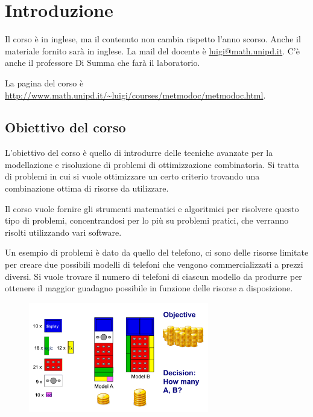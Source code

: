 

\chapter{Introduzione}

Il corso è in inglese, ma il contenuto non cambia rispetto l'anno scorso. Anche il materiale fornito sarà in inglese. La mail del docente è \url{luigi@math.unipd.it}. C'è anche il professore Di Summa che farà il laboratorio.

La pagina del corso è \url{http://www.math.unipd.it/~luigi/courses/metmodoc/metmodoc.html}.

\section{Obiettivo del corso}

L'obiettivo del corso è quello di introdurre delle tecniche avanzate per la modellazione e risoluzione di problemi di ottimizzazione combinatoria.
Si tratta di problemi in cui si vuole ottimizzare un certo criterio trovando una combinazione ottima di risorse da utilizzare.

Il corso vuole fornire gli strumenti matematici e algoritmici per risolvere questo tipo di problemi, concentrandosi per lo più su problemi pratici, che verranno risolti utilizzando vari software.

Un esempio di problemi è dato da quello del telefono, ci sono delle risorse limitate per creare due possibili modelli di telefoni che vengono commercializzati a prezzi diversi. Si vuole trovare il numero di telefoni di ciascun modello da produrre per ottenere il maggior guadagno possibile in funzione delle risorse a disposizione.

\begin{figure}[htbp]
\centering
\includegraphics[width=0.7\textwidth]{images/l1-telefono.png}
\end{figure}

